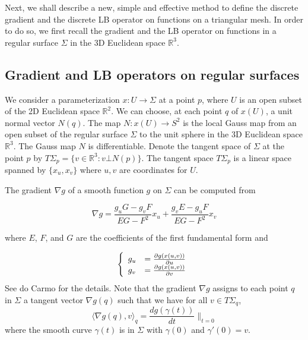 \documentclass{elsart}
\begin{document}
    Next, we shall describe a new, simple and effective method
to define the discrete gradient and the discrete LB operator on
functions on a triangular mesh. In order to do so, we first recall
the gradient and the LB operator on functions in a regular surface
$\Sigma$ in the 3D Euclidean space $\mathbb{R}^3$.

\subsection{Gradient and LB operators on regular surfaces }
We consider a parameterization $x : U \rightarrow \Sigma$ at a point
$p$, where $U$ is an open subset of the 2D Euclidean space
$\mathbb{R}^2$. We can choose, at each point $q$ of $x(U)$, a unit
normal vector $N(q)$. The map $N: x(U) \rightarrow S^2$ is the local
Gauss map from an open subset of the regular surface $\Sigma$ to the
unit sphere in the 3D Euclidean space $\mathbb{R}^3$. The Gauss map
$N$ is differentiable. Denote the tangent space of $\Sigma$ at the
point $p$ by $T\Sigma _p = \{ v \in \mathbb{R}^3 : v \bot N(p) \}$.
The tangent space $T\Sigma _p$ is a linear space spanned by $\{ x_u,
x_v \}$ where $u,v$ are coordinates for $U$.


The gradient $\nabla g$ of a smooth function $g$ on $\Sigma$ can be
computed from

\begin{equation}\label{ nabla_g}
\nabla g = \frac{g_uG - g_vF}{EG-F^2}x_u+
\frac{g_vE-g_uF}{EG-F^2}x_v
\end{equation}


where $E$, $F$, and $G$ are the coefficients of the first
fundamental form and

\begin{equation}\label{g_u_g_v}
\left \{ \begin{array}{ll}
 g_u & = \frac{\partial g(x(u,v))}{\partial u} \cr
 g_v & = \frac{\partial g(x(u,v))}{\partial v} \end{array} \right.
\end{equation}
See do Carmo\cite{Do} for the details. Note that the gradient
$\nabla g$ assigns to each point $q$ in $\Sigma$ a tangent vector
$\nabla g(q)$ such that we have for all $v \in T\Sigma _q$,
\begin{equation}\label{dot_gradient_g_v}
\langle \nabla g(q), v \rangle _q = \frac{dg(\gamma (t) )}{dt}\|
_{t=0}
\end{equation}
where the smooth curve $\gamma (t)$ is in $\Sigma$ with $\gamma (0)$
and $\gamma ' (0) = v$.
\end{document}
